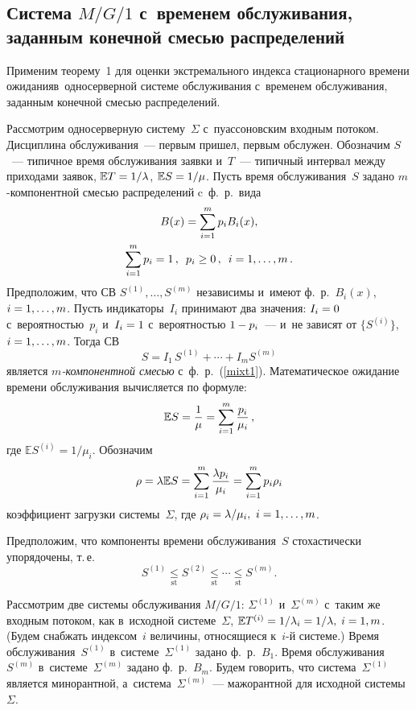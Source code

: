 \begin{multicols}{2}
\section{Система $M/G/1$ с~временем обслуживания, заданным конечной смесью 
распределений} %

Применим теорему~1 для оценки экстремального индекса стационарного времени 
ожидания\linebreak в~односерверной сис\-те\-ме обслуживания с~временем обслуживания, заданным 
конечной смесью распределений.

Рассмотрим односерверную сис\-те\-му~$\Sigma$ с~пуассоновским входным потоком. 
Дисциплина обслуживания~--- первым пришел, первым обслужен.
 Обозначим
  $S$~--- типичное время обслуживания заявки и~$T$~--- типичный интервал между 
приходами заявок, $\mathbb{E} T\hm=1/\lambda$, $\mathbb{E} S\hm=1/\mu$.  Пусть время обслуживания~$S$
  задано $m$-ком\-по\-нент\-ной смесью распределений  c~ф.~р.\ вида
  \begin{multline}
  \label{mixt1}
      B (x)= \sum\limits_{i=1}^m p_i B_i(x), \\
       \sum\limits_{i=1}^m  p_i =1\,, \enskip p_i\ge 0\,,\enskip i=1,\ldots, m\,.
  \end{multline}
  Предположим, что СВ   $S^{(1)},\dots, S^{(m)}$  независимы 
  и~имеют ф.~р.~$B_i(x)$, $i\hm=1,\dots , m$. Пусть индикаторы~$I_i$
принимают два значения: $I_i\hm= 0$ с~ве\-ро\-ят\-ностью~$p_i$  и~$I_i\hm=1$ с~ве\-ро\-ят\-ностью 
$1\hm-p_i$~--- и~не зависят от $\{S^{(i)}\},$ $i\hm=1,\dots , m$. Тогда СВ
\begin{equation*}
S=I_1\, S^{(1)} + \cdots + I_m S^{(m)}
\end{equation*}
является \textit{$m$-ком\-по\-нент\-ной смесью}  с~ф.~р.~(\ref{mixt1}).
   Математическое ожидание времени обслуживания вычисляется по формуле:
 $$
 \mathbb{E} S=\displaystyle\frac{\displaystyle 1\mathstrut}{\displaystyle \mu\mathstrut} = \sum\limits_{i=1}^m \displaystyle\frac{\displaystyle p_i\mathstrut}{\displaystyle \mu_i\mathstrut}\,,
 $$
  где $\mathbb{E} S^{(i)}=1/\mu_i$.
Обозначим
$$
\rho=\lambda \mathbb{E} S =\sum\limits_{i=1}^m \displaystyle\frac{\displaystyle \lambda p_i\mathstrut}{\displaystyle \mu_i\mathstrut} =  
\sum\limits_{i=1}^m p_i \rho_i
$$
коэффициент загрузки  сис\-те\-мы~$\Sigma$, где $\rho_i\hm=\lambda/\mu_i, \ 
i=1,\dots,m$.

Предположим, что компоненты времени обслуживания~$S$ стохастически упорядочены, 
т.\,е.
$$
S^{(1)}\underset{\mathrm{st}}{\le}S^{(2)}\underset{\mathrm{st}}{\le} \cdots \underset{\mathrm{st}}{\le}  
S^{(m)}.
$$

Рассмотрим две  системы обслуживания $M/G/1$:   $\Sigma^{(1)}$ и~$\Sigma^{(m)}$ 
с~таким же входным потоком, как в~исходной системе~$\Sigma$, $\mathbb{E} 
T^{(i)}\hm=1/\lambda_i\hm=1/\lambda,$ $i\hm=1, m$. (Будем снабжать индексом~$i$ 
величины, относящиеся к~$i$-й сис\-те\-ме.) Время обслуживания~$S^{(1)}$ в~сис\-те\-ме~$\Sigma^{(1)}$ 
задано ф.~р.~$B_1$. Время обслуживания~$S^{(m)}$ в~сис\-те\-ме~$\Sigma^{(m)}$ задано ф.~р.~$B_m$.
Будем говорить, что сис\-те\-ма~$\Sigma^{(1)}$ является минорантной, а~сис\-те\-ма~$\Sigma^{(m)}$~--- 
мажорантной для исходной сис\-те\-мы~$\Sigma$.



\end{multicols}
